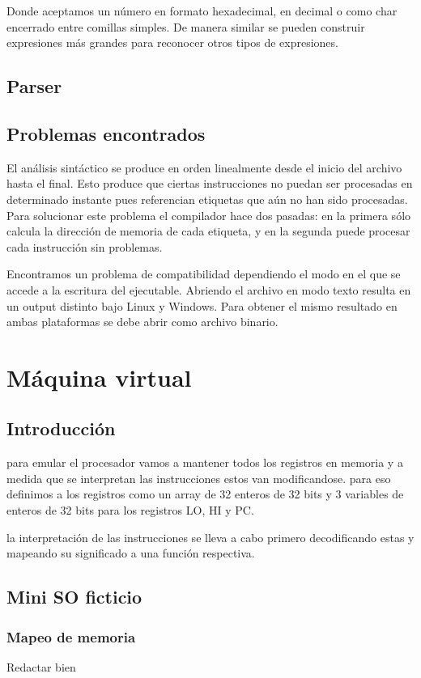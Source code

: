 \documentclass[12pt]{article}
\begin{document}
Donde aceptamos un número en formato hexadecimal, en decimal o como char encerrado entre comillas simples. De manera similar se pueden construir expresiones más grandes para reconocer otros tipos de expresiones.

\subsection{Parser}


\subsection{Problemas encontrados}

	El análisis sintáctico se produce en orden linealmente desde el inicio del archivo hasta el final. Esto produce que ciertas instrucciones no puedan ser procesadas en determinado instante pues referencian etiquetas que aún no han sido procesadas. Para solucionar este problema el compilador hace dos pasadas: en la primera sólo calcula la dirección de memoria de cada etiqueta, y en la segunda puede procesar cada instrucción sin problemas.

    Encontramos un problema de compatibilidad dependiendo el modo en el que se accede a la escritura del ejecutable. Abriendo el archivo en modo texto resulta en un output distinto bajo Linux y Windows. Para obtener el mismo resultado en ambas plataformas se debe abrir como archivo binario.
   
\section{Máquina virtual}
\subsection{Introducción}
para emular el procesador vamos a mantener todos los registros en memoria y a
medida que se interpretan las instrucciones estos van modificandose.
para eso definimos a los registros como un array de 32 enteros de 32 bits
y 3 variables de enteros de 32 bits para  los registros LO, HI y PC.

la interpretación de las instrucciones se lleva a cabo primero decodificando
estas y mapeando su significado a una función respectiva.
\subsection{Mini SO ficticio}
\subsubsection{Mapeo de memoria}
Redactar bien
\end{document}
